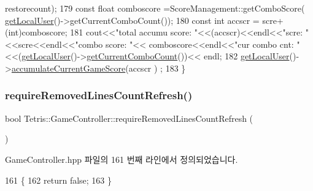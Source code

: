 \begin{DoxyCode}
      restorecount);
179                 \textcolor{keyword}{const} \textcolor{keywordtype}{float} comboscore =ScoreManagement::getComboScore(
      \hyperlink{class_tetris_1_1_game_controller_abc67d4b309ce2886b43a3b4e0af22abc}{getLocalUser}()->getCurrentComboCount());
180                 \textcolor{keyword}{const} \textcolor{keywordtype}{int} accscr = scre+(int)comboscore;
181                 cout<<\textcolor{stringliteral}{"total accumu score: "}<<(accscr)<<endl<<\textcolor{stringliteral}{"scre: "}<<scre<<endl<<\textcolor{stringliteral}{"combo score: "}<<
      comboscore<<endl<<\textcolor{stringliteral}{"cur combo cnt: "}<<(\hyperlink{class_tetris_1_1_game_controller_abc67d4b309ce2886b43a3b4e0af22abc}{getLocalUser}()->\hyperlink{class_tetris_1_1_users_1_1_game_user_a761f78f405c3d4445ae147b2c11e8364}{getCurrentComboCount}())<<
      endl;
182                   \hyperlink{class_tetris_1_1_game_controller_abc67d4b309ce2886b43a3b4e0af22abc}{getLocalUser}()->\hyperlink{class_tetris_1_1_users_1_1_game_user_a5808d26769ba24d9e6435e40d3feb7af}{accumulateCurrentGameScore}(accscr )
      ;
183             \}
\end{DoxyCode}
\mbox{\label{class_tetris_1_1_game_controller_ad8776e7b7cd905db831c7135961df453}} 
\subsubsection{\texorpdfstring{require\+Removed\+Lines\+Count\+Refresh()}{requireRemovedLinesCountRefresh()}}
{\footnotesize\ttfamily bool Tetris\+::\+Game\+Controller\+::require\+Removed\+Lines\+Count\+Refresh (\begin{DoxyParamCaption}{ }\end{DoxyParamCaption})\hspace{0.3cm}{\ttfamily [inline]}}



Game\+Controller.\+hpp 파일의 161 번째 라인에서 정의되었습니다.


\begin{DoxyCode}
161                                               \{
162             \textcolor{keywordflow}{return} \textcolor{keyword}{false};
163         \}
\end{DoxyCode}
\mbox{\label{class_tetris_1_1_game_controller_ab9ff093ea91e3d248a8a287289e758b0}} 
